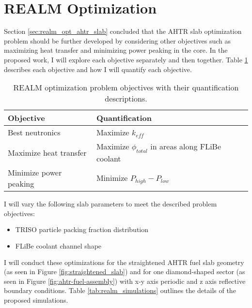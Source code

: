 \section{REALM Optimization}
Section \ref{sec:realm_opt_ahtr_slab} concluded that the \gls{AHTR} slab 
optimization problem should be further developed by considering other objectives 
such as maximizing heat transfer and minimizing power peaking in the core. 
In the proposed work, I will explore each objective separately and then together.
Table \ref{tab:objectives} describes each objective and how I will quantify 
each objective. 
\begin{table}[!htbp]
    \centering
    \onehalfspacing
    \caption{\acrfull{REALM} optimization problem objectives with their quantification 
    descriptions.}
	\label{tab:objectives}
    \footnotesize
    \begin{tabular}{p{4cm}p{8cm}}
    \hline 
    \textbf{Objective}& \textbf{Quantification}  \\
    \hline
    Best neutronics & Maximize $k_{eff}$\\ 
    Maximize heat transfer & Maximize $\phi_{total}$ in areas along FLiBe coolant \\
    Minimize power peaking & Minimize $P_{high}-P_{low}$ \\
    \hline
    \end{tabular}
\end{table}
I will vary the following slab parameters to meet the described problem objectives: 
\begin{itemize}
    \item \gls{TRISO} particle packing fraction distribution
    \item \gls{FLiBe} coolant channel shape 
\end{itemize} 
I will conduct these optimizations for the straightened \gls{AHTR} fuel slab 
geometry (as seen in Figure \ref{fig:straightened_slab}) and for one 
diamond-shaped sector (as seen in Figure \ref{fig:ahtr-fuel-assembly}) with 
x-y axis periodic and z axis reflective boundary conditions. 
Table \ref{tab:realm_simulations} outlines the details of the proposed 
simulations. 
